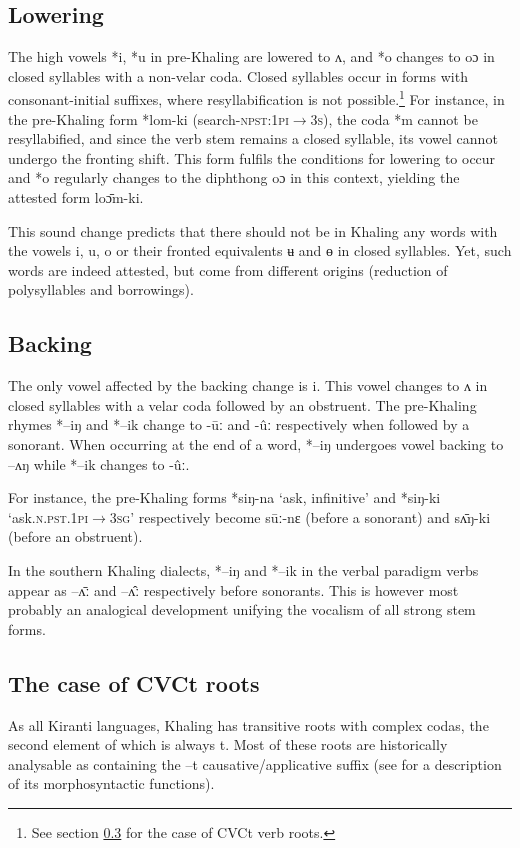 \documentclass[oldfontcommands,oneside,a4paper,11pt]{article}
\newcommand{\ipa}[1]{{\phon \mbox{#1}}} %
\begin{document}
\subsection{Lowering} \label{sec:lowering}
The high vowels \ipa{*i}, \ipa{*u}   in pre-Khaling are lowered to \ipa{ʌ},  and   \ipa{*o} changes to \ipa{oɔ} in closed syllables with a non-velar coda. Closed syllables occur in forms with consonant-initial suffixes, where resyllabification is not possible.\footnote{See section \ref{sec:cvct} for the case of CVCt verb roots.} For instance, in the pre-Khaling form \ipa{*lom-ki} (search-\textsc{npst:1pi$\rightarrow$3s}), the coda \ipa{*m} cannot be resyllabified, and since the verb stem remains a closed syllable, its vowel cannot undergo the fronting shift. This form fulfils the conditions for  lowering to occur and \ipa{*o} regularly changes to the diphthong \ipa{oɔ} in this context, yielding the attested form \ipa{loɔ̄m-ki}.


This sound change predicts that there should not be in Khaling any words with the vowels \ipa{i}, \ipa{u}, \ipa{o} or their fronted equivalents \ipa{ʉ} and \ipa{ɵ} in closed syllables. Yet, such words are indeed attested, but come from different origins (reduction of polysyllables and borrowings).

\subsection{Backing} \label{sec:backing}
The only vowel affected by the backing change is \ipa{i}. This vowel changes to \ipa{ʌ} in closed syllables with a velar coda followed by an obstruent. The pre-Khaling rhymes \ipa{*--iŋ} and \ipa{*--ik}  change to \ipa{-ūː} and \ipa{-ûː} respectively when followed by a sonorant. When occurring at the end of a word, \ipa{*--iŋ} undergoes vowel backing to \ipa{--ʌŋ} while \ipa{*--ik}  changes to \ipa{-ûː}. 

For instance, the pre-Khaling forms *\ipa{siŋ-na} `ask, infinitive' and *\ipa{siŋ-ki} `ask.\textsc{n.pst.1pi}$\rightarrow$\textsc{3sg}' respectively become \ipa{sūː-nɛ} (before a sonorant) and \ipa{sʌ̄ŋ-ki} (before an obstruent).

In the southern Khaling dialects,  \ipa{*--iŋ} and \ipa{*--ik} in the verbal paradigm verbs appear as \ipa{--ʌ̄ː} and  \ipa{--ʌ̂ː} respectively before sonorants. This is however most probably an analogical development unifying the vocalism of all strong stem forms.


\subsection{The case of CVCt roots} \label{sec:cvct}
As all Kiranti languages, Khaling has transitive roots with complex codas, the second element of which is always \ipa{t}. Most of these roots are historically analysable as containing the \ipa{--t} causative/applicative suffix (see \citealt{jacques13derivational.khaling} for a description of its morphosyntactic functions).
\end{document}
